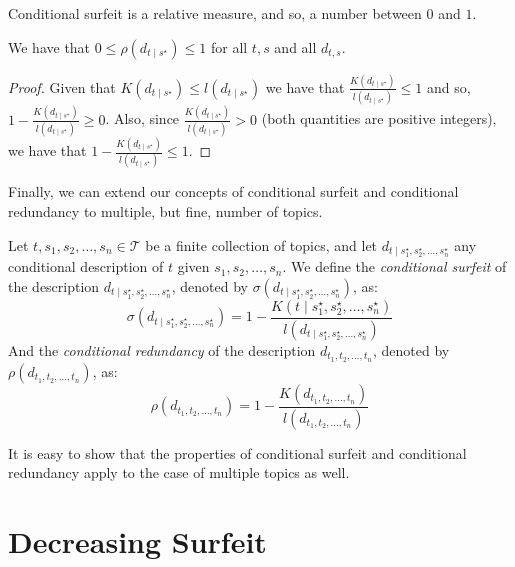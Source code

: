 Conditional surfeit is a relative measure, and so, a number between $0$ and $1$.

\begin{proposition}
We have that $0 \leq \rho(d_{t \mid s^\star}) \leq 1$ for all $t,s$ and all $d_{t,s}$.
\end{proposition}
\begin{proof}
Given that $K(d_{t \mid s^\star}) \leq l(d_{t \mid s^\star})$ we have that $\frac{K(d_{t \mid s^\star})}{l \left( d_{t \mid s^\star} \right)} \leq 1$ and so, $1 - \frac{K(d_{t \mid s^\star})}{l \left( d_{t \mid s^\star} \right)} \geq 0$. Also, since $\frac{K(d_{t \mid s^\star})}{l \left( d_{t \mid s^\star} \right)} > 0$ (both quantities are positive integers), we have that $1 - \frac{K(d_{t \mid s^\star})}{l \left( d_{t \mid s^\star} \right)} \leq 1$.
\end{proof}

Finally, we can extend our concepts of conditional surfeit and conditional redundancy to multiple, but fine, number of topics.

\begin{definition}
Let $t, s_1, s_2, \ldots, s_n \in \mathcal{T}$ be a finite collection of topics, and let $d_{t \mid s_1^\star, s_2^\star, \ldots,s_n^\star}$ any conditional description of $t$ given $s_1, s_2, \ldots, s_n$. We define the \emph{conditional surfeit} of the description $d_{t \mid s_1^\star, s_2^\star, \ldots,s_n^\star}$, denoted by $\sigma(d_{t \mid s_1^\star, s_2^\star, \ldots,s_n^\star})$, as: 
\[
\sigma(d_{t \mid s_1^\star, s_2^\star, \ldots,s_n^\star}) = 1 - \frac{K\left( t \mid s_1^\star, s_2^\star, \ldots,s_n^\star \right)}{l \left( d_{t \mid s_1^\star, s_2^\star, \ldots,s_n^\star} \right)}
\]
And the \emph{conditional redundancy} of the description $d_{t_1, t_2, \ldots, t_n}$, denoted by $\rho(d_{t_1, t_2, \ldots, t_n})$, as:
\[
\rho(d_{t_1, t_2, \ldots, t_n}) = 1 - \frac{K(d_{t_1, t_2, \ldots, t_n})}{l \left( d_{t_1, t_2, \ldots, t_n} \right)}
\]
\end{definition}

It is easy to show that the properties of conditional surfeit and conditional redundancy apply to the case of multiple topics as well.

%
%

\section{Decreasing Surfeit}

